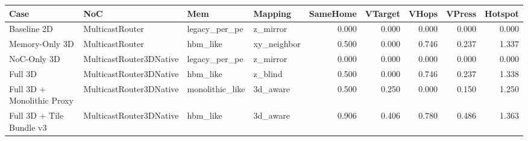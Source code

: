 \begin{tabular}{l l l l r r r r r}
\hline
Case & NoC & Mem & Mapping & SameHome & VTarget & VHops & VPress & Hotspot \\
\hline
Baseline 2D & MulticastRouter & legacy\_per\_pe & z\_mirror & 0.000 & 0.000 & 0.000 & 0.000 & 0.000 \\
Memory-Only 3D & MulticastRouter & hbm\_like & xy\_neighbor & 0.500 & 0.000 & 0.746 & 0.237 & 1.337 \\
NoC-Only 3D & MulticastRouter3DNative & legacy\_per\_pe & z\_mirror & 0.000 & 0.000 & 0.000 & 0.000 & 0.000 \\
Full 3D & MulticastRouter3DNative & hbm\_like & z\_blind & 0.500 & 0.000 & 0.746 & 0.237 & 1.338 \\
Full 3D + Monolithic Proxy & MulticastRouter3DNative & monolithic\_like & 3d\_aware & 0.500 & 0.250 & 0.000 & 0.150 & 1.250 \\
Full 3D + Tile Bundle v3 & MulticastRouter3DNative & hbm\_like & 3d\_aware & 0.906 & 0.406 & 0.780 & 0.486 & 1.363 \\
\hline
\end{tabular}
